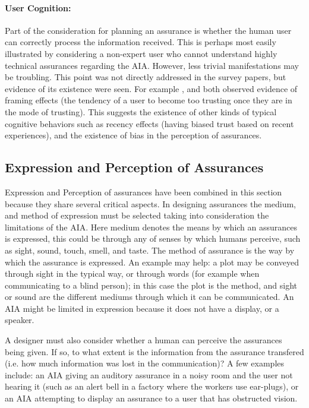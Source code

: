     \paragraph{User Cognition:} Part of the consideration for planning an assurance is whether the human user can correctly process the information received. This is perhaps most easily illustrated by considering a non-expert user who cannot understand highly technical assurances regarding the AIA. However, less trivial manifestations may be troubling. This point was not directly addressed in the survey papers, but evidence of its existence were seen. For example \cite{Riley1996-qm}, and \cite{Freedy2007-sg} both observed evidence of framing effects (the tendency of a user to become too trusting once they are in the mode of trusting). This suggests the existence of other kinds of typical cognitive behaviors such as recency effects (having biased trust based on recent experiences), and the existence of bias in the perception of assurances.

\subsection{Expression and Perception of Assurances} \label{sec:express_assurances}
    Expression and Perception of assurances have been combined in this section because they share several critical aspects. In designing assurances the medium, and method of expression must be selected taking into consideration the limitations of the AIA. Here medium denotes the means by which an assurances is expressed, this could be through any of senses by which humans perceive, such as sight, sound, touch, smell, and taste. The method of assurance is the way by which the assurance is expressed. An example may help: a plot may be conveyed through sight in the typical way, or through words (for example when communicating to a blind person); in this case the plot is the method, and sight or sound are the different mediums through which it can be communicated. An AIA might be limited in expression because it does not have a display, or a speaker.

    A designer must also consider whether a human can perceive the assurances being given. If so, to what extent is the information from the assurance transfered (i.e. how much information was lost in the communication)? A few examples include: an AIA giving an auditory assurance in a noisy room and the user not hearing it (such as an alert bell in a factory where the workers use ear-plugs), or an AIA attempting to display an assurance to a user that has obstructed vision.
    
